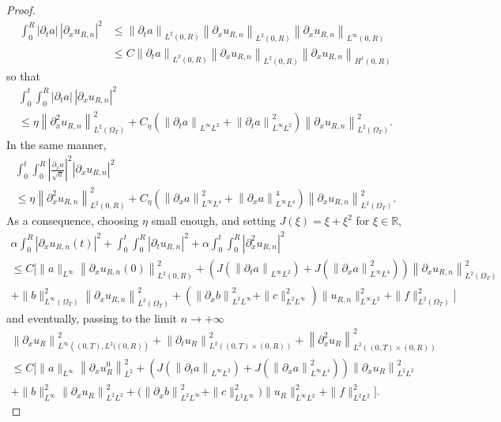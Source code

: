 \documentclass[AHL,Unicode,longabstracts,published]{cedram}
\newcommand{\R}{\mathbb{R}}
\newcommand{\p}{\partial}
\begin{document}
\begin{proof}
\begin{align*}
\int_0^R \left|\partial_t a\right|\, \left|\partial_x u_{R,n}\right|^2 & \leq \left\|\partial_t a\right\|_{L^2(0,R)} \left\|\partial_x u_{R,n}\right\|_{L^2(0,R)} \left\|\partial_x u_{R,n}\right\|_{L^\infty(0,R)} \\
& \leq C \left\|\partial_t a\right\|_{L^2(0,R)} \left\|\partial_x u_{R,n}\right\|_{L^2(0,R)} \left\|\partial_x u_{R,n}\right\|_{H^1(0,R)}
\end{align*}
so that
\begin{multline*}
\int_0^t \int_0^R \left|\partial_t a\right|\,\left|\partial_x u_{R,n}\right|^2 \\
\leq \eta \left\|\partial^2_x u_{R,n}\right\|_{L^2(\Omega_T)}^{2} + C_\eta \left(\left\|\partial_t a\right\|_{L^\infty L^2}+ \left\|\partial_t a\right\|_{L^\infty L^2}^2\right) \left\|\partial_x u_{R,n}\right\|_{L^2(\Omega_T)}^2.
\end{multline*}
In the same manner,
\begin{multline*}
\int_0^t\int_0^R \left|\frac{\partial_x a}{\sqrt{a}}\right|^2 \left|\partial_x u_{R,n}\right|^2 \\
\leq \eta \left\|\partial^2_x u_{R,n}\right\|_{L^2(0,R)}^{2} + C_\eta\left(\left\|\partial_x a\right\|_{L^\infty L^4}^2 +\left\|\partial_x a\right\|_{L^\infty L^4}^4\right) \left\|\partial_x u_{R,n}\right\|_{L^2(\Omega_T)}^2.
\end{multline*}
As a consequence, choosing $\eta$ small enough, and setting $J(\xi)=\xi + \xi^2$ for $\xi\in \R$,
\begin{multline*}
\alpha \int_0^R \left|\partial_x u_{R,n}(t)\right|^2 + \int_0^t \int_0^R \left|\partial_t u_{R,n}\right|^2 + \alpha \int_0^t \int_0^R \left|\partial^2_x u_{R,n}\right|^2\\
\leq C \Bigg[\|a\|_{L^\infty} \left\|\partial_x u_{R,n}(0)\right\|_{L^2(0,R)}^2 + \left(J\left(\left\|\partial_t a\right\|_{L^\infty L^2}\right) + J\left(\left\|\partial_x a\right\|_{L^\infty L^4}^2\right)\right) \left\|\partial_x u_{R,n}\right\|_{L^2(\Omega_T)}^2 \\
 + \|b\|_{L^\infty(\Omega_T)}^2 \left\|\partial_x u_{R,n}\right\|_{L^2(\Omega_T)}^2 +\left(\left\|\partial_x b\right\|_{L^2 L^\infty}^2 + \|c\|_{L^2 L^\infty}^2\right) \|u_{R,n}\|_{L^\infty L^2}^2 + \|f\|_{L^2(\Omega_T)}^2 \Bigg]
\end{multline*}
and eventually, passing to the limit $n\to +\infty$
\begin{multline*}
\left\| \p_x u_{R}\right\|_{L^\infty\left((0,T), L^2((0,R)\right)}^2 + \left\| \p_t u_{R}\right\|_{L^2\left((0,T)\times (0,R)\right)}^2 + \left\|\p_x^2 u_{R}\right\|_{L^2\left((0,T)\times (0,R)\right)}^2 \\
\leq C \Bigg[
\|a\|_{L^\infty}\left\|\partial_x u^0_R\right\|_{L^2}^2 + \left(J\left(\left\|\partial_t a\right\|_{L^\infty L^2}\right) + J\left(\left\|\partial_x a\right\|_{L^\infty L^4}^2\right)\right) \left\|\partial_x u_R\right\|_{L^2 L^2}^2
\\
+ \|b\|_{L^\infty}^2 \left\|\partial_x u_R\right\|_{L^2 L^2}^2+\big(\left\|\partial_x b\right\|_{L^2 L^\infty}^2 + \|c\|_{L^2L^\infty}^2\big) \|u_R\|_{L^\infty L^2}^2 + \|f\|_{L^2 L^2}^2
\Bigg].
\end{multline*}


\end{proof}
\end{document}
